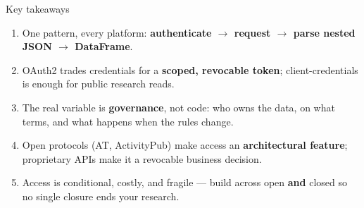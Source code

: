 \documentclass[9pt,aspectratio=169]{beamer}
\begin{document}
\begin{frame}{Key takeaways}
    \begin{enumerate}
        \item One pattern, every platform: \textbf{authenticate $\rightarrow$ request $\rightarrow$ parse nested JSON $\rightarrow$ DataFrame}.
        \item OAuth2 trades credentials for a \textbf{scoped, revocable token}; client-credentials is enough for public research reads.
        \item The real variable is \textbf{governance}, not code: who owns the data, on what terms, and what happens when the rules change.
        \item Open protocols (AT, ActivityPub) make access an \textbf{architectural feature}; proprietary APIs make it a revocable business decision.
        \item Access is conditional, costly, and fragile --- build across open \textbf{and} closed so no single closure ends your research.
    \end{enumerate}
    \vspace{1em}
\end{frame}
\end{document}
